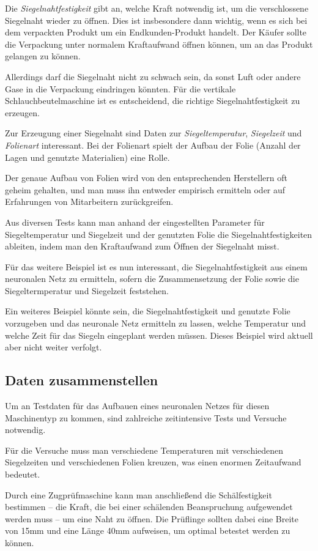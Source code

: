 Die \textit{Siegelnahtfestigkeit} gibt an, welche Kraft notwendig ist, um die verschlossene Siegelnaht wieder zu öffnen.
Dies ist insbesondere dann wichtig, wenn es sich bei dem verpackten Produkt um ein Endkunden-Produkt handelt. Der Käufer
sollte die Verpackung unter normalem Kraftaufwand öffnen können, um an das Produkt gelangen zu können.

Allerdings darf die Siegelnaht nicht zu schwach sein, da sonst Luft oder andere Gase in die Verpackung eindringen
könnten. Für die vertikale Schlauchbeutelmaschine ist es entscheidend, die richtige Siegelnahtfestigkeit zu erzeugen.

Zur Erzeugung einer Siegelnaht sind Daten zur \textit{Siegeltemperatur}, \textit{Siegelzeit} und \textit{Folienart}
interessant. Bei der Folienart spielt der Aufbau der Folie (Anzahl der Lagen und genutzte Materialien) eine Rolle.

Der genaue Aufbau von Folien wird von den entsprechenden Herstellern oft geheim gehalten, und man muss ihn entweder
empirisch ermitteln oder auf Erfahrungen von Mitarbeitern zurückgreifen.

Aus diversen Tests kann man anhand der eingestellten Parameter für Siegeltemperatur und Siegelzeit und der genutzten
Folie die Siegelnahtfestigkeiten ableiten, indem man den Kraftaufwand zum Öffnen der Siegelnaht misst.

Für das weitere Beispiel ist es nun interessant, die Siegelnahtfestigkeit aus einem neuronalen Netz zu ermitteln, sofern
die Zusammensetzung der Folie sowie die Siegeltermperatur und Siegelzeit feststehen.

Ein weiteres Beispiel könnte sein, die Siegelnahtfestigkeit und genutzte Folie vorzugeben und das neuronale Netz
ermitteln zu lassen, welche Temperatur und welche Zeit für das Siegeln eingeplant werden müssen. Dieses Beispiel wird
aktuell aber nicht weiter verfolgt.

\subsection{Daten zusammenstellen}
Um an Testdaten für das Aufbauen eines neuronalen Netzes für diesen Maschinentyp zu kommen, sind zahlreiche
zeitintensive Tests und Versuche notwendig.

Für die Versuche muss man verschiedene Temperaturen mit verschiedenen Siegelzeiten und verschiedenen Folien kreuzen, was
einen enormen Zeitaufwand bedeutet.

Durch eine Zugprüfmaschine kann man anschließend die Schälfestigkeit bestimmen -- die Kraft, die bei einer schälenden
Beanspruchung aufgewendet werden muss -- um eine Naht zu öffnen. Die Prüflinge sollten dabei eine Breite von 15mm und
eine Länge 40mm aufweisen, um optimal betestet werden zu können.

